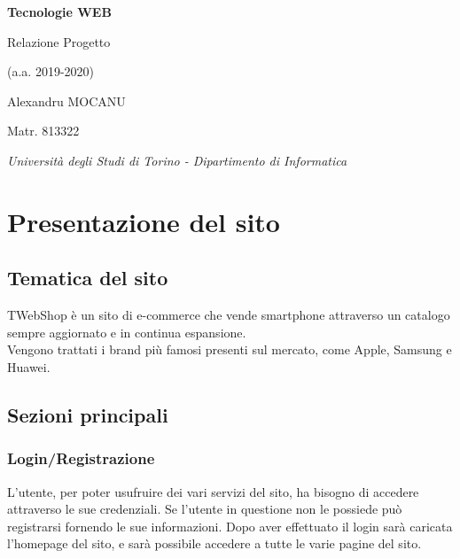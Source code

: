 \documentclass[12pt]{extarticle}
\begin{document}
\begin{titlepage}
\centering
{\LARGE\bfseries Tecnologie WEB}

\vspace{1cm}

{\Large Relazione Progetto}

\vspace{0.2cm}
{\large (a.a. 2019-2020)}

\vspace{2cm}

{\large Alexandru MOCANU}

\vspace{0.2cm}

{\small Matr. 813322}


\vspace{2cm}


\vfill

{\itshape Università degli Studi di Torino - Dipartimento di Informatica}
\end{titlepage}

\tableofcontents

\clearpage

\section{Presentazione del sito}
\subsection{Tematica del sito}
TWebShop è un sito di e-commerce che vende smartphone attraverso un catalogo sempre
aggiornato e in continua espansione.
\\
Vengono trattati i brand più famosi presenti sul mercato, come Apple, Samsung e Huawei.

\subsection{Sezioni principali}
\subsubsection{Login/Registrazione}
L'utente, per poter usufruire dei vari servizi del sito, ha bisogno di
accedere attraverso le sue credenziali. Se l'utente in questione non le possiede può registrarsi
fornendo le sue informazioni. Dopo aver effettuato il login sarà caricata l'homepage del sito, e
sarà possibile accedere a tutte le varie pagine del sito.
\end{document}
